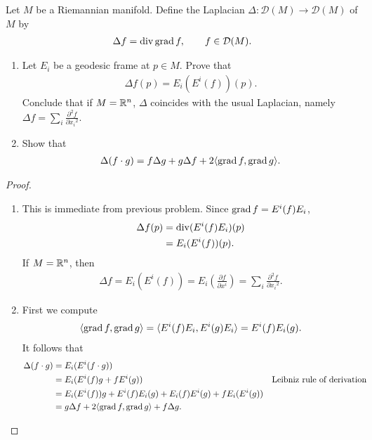 \documentclass[12pt]{article}
\begin{document}
\begin{problem}[do Carmo 3.9]
Let $ M$ be a Riemannian manifold. Define the Laplacian $ \Delta: \mathcal{ D}(M) \to \mathcal{ D}(M)$ of $ M$ by
 \begin{align*}
	\Delta f = \operatorname{div} \operatorname{grad} f, \qquad f \in \mathcal{ D}(M).
\end{align*}
\begin{enumerate}[label=(\alph*)]
	\item Let $ E_i$ be a geodesic frame at $ p \in M$. Prove that
	\begin{align*}
		\Delta f(p) = E_i (E^{i}(f))(p) .
	\end{align*}
	Conclude that if $ M = \mathbb{R}^{n}$, $ \Delta$ coincides with the usual Laplacian, namely $ \Delta f = \sum_i \frac{\partial^2 f}{\partial { x_i}^2} $. 
\item Show that
	\begin{align*}
		\Delta (f \cdot g) = f \Delta g + g \Delta f + 2\langle \operatorname{grad} f, \operatorname{grad} g \rangle .
	\end{align*}
\end{enumerate}
\end{problem}
\begin{proof}
\begin{enumerate}[label=(\alph*)]
	\item This is immediate from previous problem. Since $ \operatorname{grad} f = E^i(f) E_i$,
	\begin{align*}
		\Delta f(p) &= \operatorname{div} (E^i(f) E_i)(p) \\
		&= E_i(E^{i} (f)) (p) .
	\end{align*}
	If $ M = \mathbb{R}^{n}$, then 
	\begin{align*}
		\Delta f = E_{i} (E^{i}(f)) = E_{i} \left( \frac{\partial f}{\partial x^i}  \right) = \sum_i \frac{\partial^2 f}{\partial { x_{i}}^2} .
	\end{align*}
\item First we compute
	\begin{align*}
		\langle \operatorname{grad} f, \operatorname{grad} g \rangle = \langle E^{i}(f) E_i, E^{i}(g) E_i \rangle = E^{i}(f) E_{i}(g) .
	\end{align*}
It follows that
\begin{align*}
	\Delta (f \cdot g) &= E_i(E^{i}(f \cdot g)) \\
			   &= E_i(E^{i}(f) g + f E^{i}(g)) && \text{Leibniz rule of derivation}  \\
			   &= E_i(E^{i}(f)) g + E^i(f)E_i(g) + E_i (f) E^{i}(g) + f E_i(E^{i}(g)) \\
			   &= g\Delta f  + 2 \langle \operatorname{grad} f, \operatorname{grad} g \rangle + f \Delta g .
\end{align*}
\end{enumerate}
\end{proof}
\end{document}

